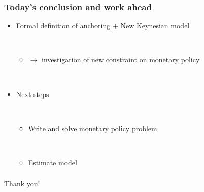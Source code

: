 \documentclass{beamer}
\begin{document}
\begin{frame}
	\frametitle{Today's conclusion and work ahead}
\vspace{-1cm}
	
\begin{itemize}
\item Formal definition of anchoring $+$ New Keynesian model

\

\begin{itemize}
\item[] $\rightarrow$ investigation of new constraint on monetary policy
\end{itemize}

\

\item Next steps

\

\begin{itemize}
\item Write and solve monetary policy problem

\

\item Estimate model
\end{itemize}

\end{itemize}


\end{frame}

\begin{frame}
	\frametitle{}
\vspace{-1cm}
	
\centering Thank you!


\end{frame}


%

%	
%



\appendix
\end{document}

